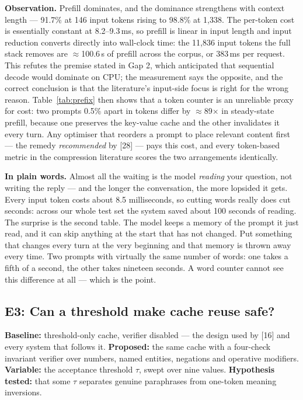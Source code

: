 \documentclass[11pt,a4paper]{article}
\newcommand{\obs}[1]{%
  \par\vspace{2pt}
  \noindent\begin{tcolorbox}[colback=soft,colframe=accent,boxrule=0pt,
    leftrule=2.2pt,arc=0pt,left=7pt,right=5pt,top=4pt,bottom=4pt,breakable]
  \small\textbf{Observation.} #1
  \end{tcolorbox}\par\vspace{2pt}}
\newcommand{\plain}[1]{%
  \par\vspace{1pt}
  \noindent\begin{tcolorbox}[colback=plainblue,colframe=plainrule,boxrule=0pt,
    leftrule=2.2pt,arc=0pt,left=7pt,right=5pt,top=4pt,bottom=4pt,breakable]
  \small\textbf{In plain words.} #1
  \end{tcolorbox}\par\vspace{2pt}}
\begin{document}
\obs{Prefill dominates, and the dominance strengthens with context length ---
91.7\% at 146 input tokens rising to 98.8\% at 1{,}338. The per-token cost is
essentially constant at 8.2--9.3\,ms, so prefill is linear in input length and
input reduction converts directly into wall-clock time: the 11{,}836 input tokens
the full stack removes are $\approx$100.6\,s of prefill across the corpus, or
383\,ms per request. This refutes the premise stated in Gap 2, which anticipated
that sequential decode would dominate on CPU; the measurement says the opposite,
and the correct conclusion is that the literature's input-side focus is right for
the wrong reason. Table~\ref{tab:prefix} then shows that a token counter is an
unreliable proxy for cost: two prompts 0.5\% apart in tokens differ by
$\approx$89$\times$ in steady-state prefill, because one preserves the key-value
cache and the other invalidates it every turn. Any optimiser that reorders a
prompt to place relevant content first --- the remedy \emph{recommended} by [28]
--- pays this cost, and every token-based metric in the compression literature
scores the two arrangements identically.}

\plain{Almost all the waiting is the model \emph{reading} your question, not
writing the reply --- and the longer the conversation, the more lopsided it gets.
Every input token costs about 8.5 milliseconds, so cutting words really does cut
seconds: across our whole test set the system saved about 100 seconds of reading.
The surprise is the second table. The model keeps a memory of the prompt it just
read, and it can skip anything at the start that has not changed. Put something
that changes every turn at the very beginning and that memory is thrown away
every time. Two prompts with virtually the same number of words: one takes a
fifth of a second, the other takes nineteen seconds. A word counter cannot see
this difference at all --- which is the point.}

\subsection{E3: Can a threshold make cache reuse safe?}
\label{sec:e3}

\textbf{Baseline:} threshold-only cache, verifier disabled --- the design used by
[16] and every system that follows it.
\textbf{Proposed:} the same cache with a four-check invariant verifier over
numbers, named entities, negations and operative modifiers.
\textbf{Variable:} the acceptance threshold $\tau$, swept over nine values.
\textbf{Hypothesis tested:} that some $\tau$ separates genuine paraphrases from
one-token meaning inversions.
\end{document}
